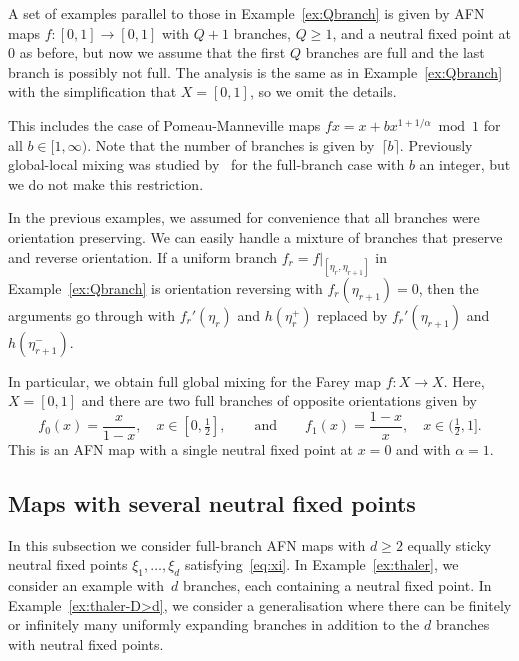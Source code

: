 \documentclass[12pt]{article}
\numberwithin{equation}{section}
\begin{document}
\begin{example} \label{ex:genPM}
A set of examples parallel to those in Example~\ref{ex:Qbranch}
is given by AFN maps $f:[0,1]\to[0,1]$ with $Q+1$ branches, $Q\ge1$, and a neutral fixed point at $0$ as before, but now we assume that the first $Q$ branches are full and the last branch is possibly not full.
The analysis is the same as in Example~\ref{ex:Qbranch} with the simplification that $X=[0,1]$, so we omit the details.

This includes the case of Pomeau-Manneville maps 
$fx=x+b x^{1+1/\alpha} \bmod1$ for all $b\in[1,\infty)$. Note that the number of branches is given by~$\lceil b\rceil$.
Previously global-local mixing was studied by~\cite{BonannoLenci21} for the full-branch case with $b$ an integer, but we do not make this restriction.
\end{example}

\begin{example}\label{ex:Farey}
In the previous examples, we assumed for convenience that all branches were orientation preserving. We can easily handle a mixture of branches that preserve and reverse orientation. If a uniform branch $f_r=f|_{[\eta_r,\eta_{r+1}]}$ in Example~\ref{ex:Qbranch} is orientation reversing with $f_r(\eta_{r+1})=0$, then the arguments go through with
$f_r'(\eta_r)$ and $h(\eta_r^+)$ replaced by
$f_r'(\eta_{r+1})$ and $h(\eta_{r+1}^-)$.

In particular, we obtain full global mixing for the 
  Farey map $f : X \to X$. Here, $X=[0,1]$ and there are two full branches of opposite orientations given by
\[
      f_0(x)=\dfrac{ x }{ 1 - x },\quad  x \in [0,\tfrac12], \qquad\text{and}\qquad
      f_1(x)=\dfrac{ 1 - x }{ x },\quad  x \in (\tfrac12,1].
\]
This is an AFN map with a single neutral fixed point at $x=0$ and with $\alpha=1$.
\end{example}


\subsection{Maps with several neutral fixed points}
\label{sec:several}

In this subsection we consider full-branch AFN maps with $d\ge2$ equally sticky neutral fixed points $\xi_1,\dots,\xi_d$ satisfying~\eqref{eq:xi}.
In Example~\ref{ex:thaler}, we consider an example with~$d$ branches, each containing a neutral fixed point. 
In Example~\ref{ex:thaler-D>d}, we consider a generalisation where there can be finitely or infinitely many uniformly expanding branches in addition to the $d$ branches with neutral fixed points.
\end{document}
